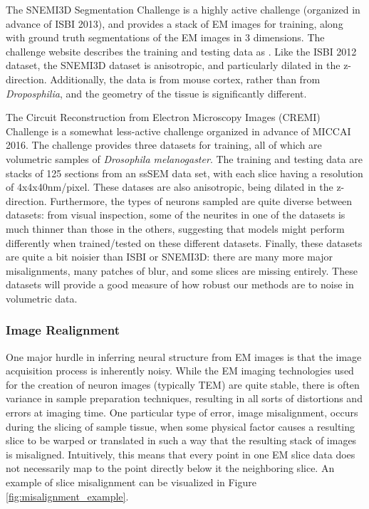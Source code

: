 The SNEMI3D Segmentation Challenge is a highly active challenge (organized in advance of ISBI 2013), and provides a stack of EM images for training, along with ground truth segmentations of the EM images in 3 dimensions. The challenge website describes the training and testing data as \cite{Arganda-Carreras2013}. Like the ISBI 2012 dataset, the SNEMI3D dataset is anisotropic, and particularly dilated in the z-direction. Additionally, the data is from mouse cortex, rather than from \textit{Droposphilia}, and the geometry of the tissue is significantly different. 

The Circuit Reconstruction from Electron Microscopy Images (CREMI) Challenge is a somewhat less-active challenge organized in advance of MICCAI 2016\cite{Funke.Jan2016}. The challenge provides three datasets for training, all of which are volumetric samples of \textit{Drosophila melanogaster}. The training and testing data are stacks of 125 sections from an ssSEM data set, with each slice having a resolution of 4x4x40nm/pixel. These datases are also anisotropic, being dilated in the z-direction. Furthermore, the types of neurons sampled are quite diverse between datasets: from visual inspection, some of the neurites in one of the datasets is much thinner than those in the others, suggesting that models might perform differently when trained/tested on these different datasets. Finally, these datasets are quite a bit noisier than ISBI or SNEMI3D: there are many more major misalignments, many patches of blur, and some slices are missing entirely. These datasets will provide a good measure of how robust our methods are to noise in volumetric data. 

\medskip

\subsubsection*{Image Realignment}

One major hurdle in inferring neural structure from EM images is that the image acquisition process is inherently noisy. While the EM imaging technologies used for the creation of neuron images (typically TEM) are quite stable, there is often variance in sample preparation techniques, resulting in all sorts of distortions and errors at imaging time. One particular type of error, image misalignment, occurs during the slicing of sample tissue, when some physical factor causes a resulting slice to be warped or translated in such a way that the resulting stack of images is misaligned. Intuitively, this means that every point in one EM slice data does not necessarily map to the point directly below it the neighboring slice. An example of slice misalignment can be visualized in Figure \ref{fig:misalignment_example}.

